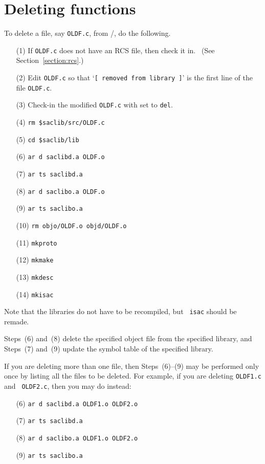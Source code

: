 \section{Deleting functions}

To delete a file, say {\tt OLDF.c}, from \SACLIB/, do the
following.
\begin{itemize}
\item[(1)] If {\tt OLDF.c} does not have an RCS file, then
check it in. \ (See Section~\ref{section:rcs}.)
\item[(2)] Edit {\tt OLDF.c} so that `{\tt [ removed from library
]}' is the first line of the file {\tt OLDF.c}.
\item[(3)] Check-in the modified {\tt OLDF.c} with 
set to {\tt del}.
\item[(4)]  {\tt rm \$saclib/src/OLDF.c}
\item[(5)]  {\tt cd \$saclib/lib}
\item[(6)]  {\tt ar d saclibd.a OLDF.o}
\item[(7)]  {\tt ar ts saclibd.a}
\item[(8)]  {\tt ar d saclibo.a OLDF.o}
\item[(9)]  {\tt ar ts saclibo.a}
\item[(10)]  {\tt rm objo/OLDF.o objd/OLDF.o}
\item[(11)]  {\tt mkproto}
\item[(12)]  {\tt mkmake}
\item[(13)]  {\tt mkdesc}
\item[(14)]  {\tt mkisac}
\end{itemize}

Note that the libraries do not have to be recompiled, but {\tt
isac} should be remade.


Steps~(6) and~(8) delete the specified object file from the
specified library, and Steps~(7) and~(9) update the symbol table
of the specified library.

If you are deleting more than one file, then Steps~(6)--(9) may
be performed only once by listing all the files to be deleted.
For example, if you are deleting {\tt OLDF1.c} and {\tt
OLDF2.c}, then you may do instead:
\begin{itemize}
\item[(6)]  {\tt ar d saclibd.a OLDF1.o OLDF2.o}
\item[(7)]  {\tt ar ts saclibd.a}
\item[(8)]  {\tt ar d saclibo.a OLDF1.o OLDF2.o}
\item[(9)]  {\tt ar ts saclibo.a}
\end{itemize}


